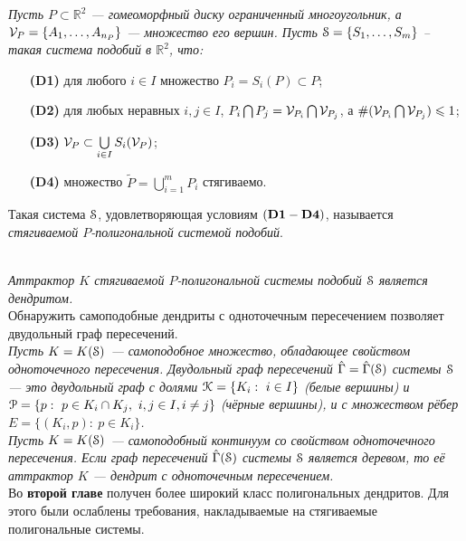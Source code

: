 \documentclass[a5paper,9pt,twoside]{extarticle} %
\begin{document}
{\em  Пусть $P\subset\mathbb{R}^2$ ---  гомеоморфный диску ограниченный многоугольник, а $ {\mathcal V}_P= \{A_1, \ldots, A_{n_P}\}$ --- множество его вершин.
Пусть  ${\EuScript S} = \{S_1, \ldots, S_m\}$ -- такая система подобий в ${\mathbb{R}}^2$, что:
\begin{itemize}[nolistsep]
\item[{\bf (D1)}] для любого $i \in I$ множество $P_i = S_i (P) \subset P$; 
\item[{\bf (D2)}] для любых неравных $i, j \in I$,  $P_i \bigcap P_j =  {\mathcal V}_{P_i} \bigcap  {\mathcal V}_{P_j}$, а $\#({\mathcal V}_{P_i} \bigcap  {\mathcal V}_{P_j})\leqslant 1$;  
\item[{\bf (D3)}] ${\mathcal V}_P \subset \bigcup \limits_{i \in I} S_i ({\mathcal V}_P)$;
\item[{\bf (D4)}] множество $\widetilde P = \bigcup \limits_{i = 1} ^m P_i$ стягиваемо.
\end{itemize} 
Такая система  ${\EuScript S}$, удовлетворяющая условиям $\bf (D1 - D4)$, называется  {\em стягиваемой $P$-полигональной системой подобий}.}\\

{\em  Аттрактор $K$  стягиваемой  $P$-полигональной системы подобий ${\EuScript S}$ является дендритом.}\\

Обнаружить самоподобные дендриты с одноточечным пересечением позволяет двудольный граф пересечений.\\

{\em  Пусть $K=K({\EuScript S})$ --- самоподобное множество, обладающее свойством одноточечного пересечения.
{\em Двудольный граф пересечений} $\hat\Gamma=\hat\Gamma({\EuScript S})$ системы ${\EuScript S}$ --- это двудольный граф с долями ${\EuScript K}=\{K_i:\ i\in I\}$ (белые вершины) и ${\EuScript P}=\{p:\ p\in K_i\cap K_j,\ i,j\in I, i\neq j\}$ (чёрные вершины), и с множеством рёбер $E=\{(K_i,p):\ p\in K_i\}$.}\\

{\em Пусть $K=K({\EuScript S})$ --- самоподобный континуум со свойством одноточечного пересечения.
Если граф пересечений $\hat\Gamma({\EuScript S})$ системы ${\EuScript S}$ является деревом, то её аттрактор $K$ --- дендрит с одноточечным пересечением.}\\



Во \textbf{второй главе} получен более широкий класс полигональных дендритов. 
Для этого были ослаблены требования, накладываемые на стягиваемые полигональные системы.
\end{document}
